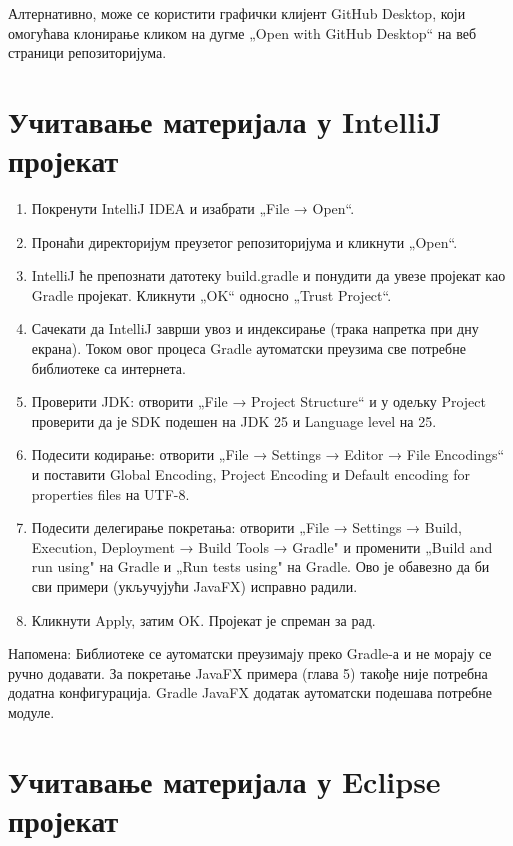 Алтернативно, може се користити графички клијент GitHub Desktop, који омогућава клонирање кликом на дугме „Open with GitHub Desktop“ на веб страници репозиторијума.

\section{Учитавање материјала у IntelliJ пројекат}

\begin{enumerate}
\item Покренути IntelliJ IDEA и изабрати „File → Open“.
\item Пронаћи директоријум преузетог репозиторијума и кликнути „Open“.
\item IntelliJ ће препознати датотеку build.gradle и понудити да увезе пројекат као Gradle пројекат. Кликнути „OK“ односно „Trust Project“.
\item Сачекати да IntelliJ заврши увоз и индексирање (трака напретка при дну екрана). Током овог процеса Gradle аутоматски преузима све потребне библиотеке са интернета.
\item Проверити JDK: отворити „File → Project Structure“ и у одељку Project проверити да је SDK подешен на JDK 25 и Language level на 25.
\item Подесити кодирање: отворити „File → Settings → Editor → File Encodings“ и поставити Global Encoding, Project Encoding и Default encoding for properties files на UTF-8.
\item Подесити делегирање покретања: отворити „File → Settings → Build, Execution, Deployment → Build Tools → Gradle" и променити „Build and run using" на Gradle и „Run tests using" на Gradle. Ово је обавезно да би сви примери (укључујући JavaFX) исправно радили.
\item Кликнути Apply, затим OK. Пројекат је спреман за рад.
\end{enumerate}
Напомена: Библиотеке се аутоматски преузимају преко Gradle-а и не морају се ручно додавати. За покретање JavaFX примера (глава 5) такође није потребна додатна конфигурација. Gradle JavaFX додатак аутоматски подешава потребне модуле.

\section{Учитавање материјала у Eclipse пројекат}

